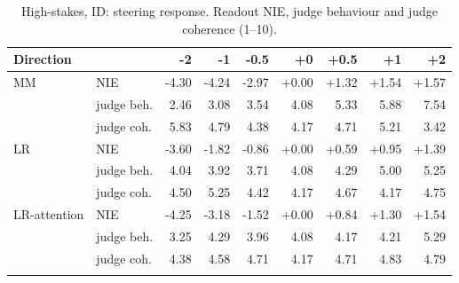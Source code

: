\begin{table}[H]
\begin{minipage}[t]{0.49\textwidth}
\begin{tabular}{llrrrrrrr}
\toprule
Direction & & -2 & -1 & -0.5 & +0 & +0.5 & +1 & +2 \\
\midrule
MM & NIE & -4.30 & -4.24 & -2.97 & +0.00 & +1.32 & +1.54 & +1.57 \\
 & judge beh. & 2.46 & 3.08 & 3.54 & 4.08 & 5.33 & 5.88 & 7.54 \\
 & judge coh. & 5.83 & 4.79 & 4.38 & 4.17 & 4.71 & 5.21 & 3.42 \\
\addlinespace[2pt]
LR & NIE & -3.60 & -1.82 & -0.86 & +0.00 & +0.59 & +0.95 & +1.39 \\
 & judge beh. & 4.04 & 3.92 & 3.71 & 4.08 & 4.29 & 5.00 & 5.25 \\
 & judge coh. & 4.50 & 5.25 & 4.42 & 4.17 & 4.67 & 4.17 & 4.75 \\
\addlinespace[2pt]
LR-attention & NIE & -4.25 & -3.18 & -1.52 & +0.00 & +0.84 & +1.30 & +1.54 \\
 & judge beh. & 3.25 & 4.29 & 3.96 & 4.08 & 4.17 & 4.21 & 5.29 \\
 & judge coh. & 4.38 & 4.58 & 4.71 & 4.17 & 4.71 & 4.83 & 4.79 \\
\addlinespace[2pt]
\bottomrule
\end{tabular}
\caption{High-stakes, ID: steering response. Readout NIE, judge behaviour and judge coherence (1--10).}
\label{tab:app-steer-highstakes-ID}
\end{minipage}
\end{table}

